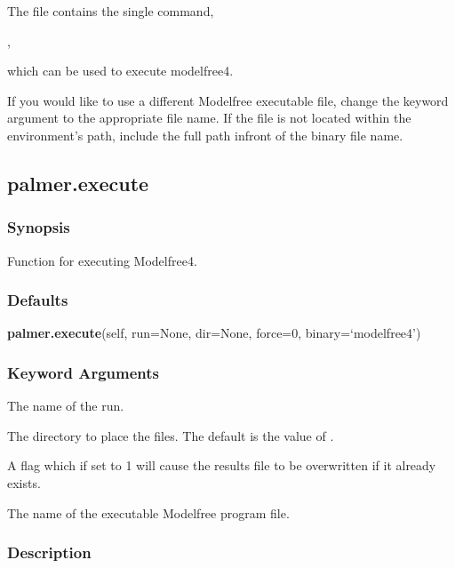  The file  contains the single command, 
  

 , 
  

 which can be used to execute modelfree4. 
  

 If you would like to use a different Modelfree executable file, change the keyword argument  to the appropriate file name.  If the file is not located within the environment's path, include the full path infront of the binary file name. 
  

  

 \newpage 

 \subsection{palmer.execute} 

  
 \subsubsection{Synopsis} 

 Function for executing Modelfree4. 
  

  
 \subsubsection{Defaults} 

 \textsf{\textbf{palmer.execute}(self, run=None, dir=None, force=0, binary=`modelfree4')} 

  
 \subsubsection{Keyword Arguments} 

   The name of the run.   

   The directory to place the files.  The default is the value of .   

   A flag which if set to 1 will cause the results file to be overwritten if it already exists.   

   The name of the executable Modelfree program file.  

  

  
 \subsubsection{Description} 


